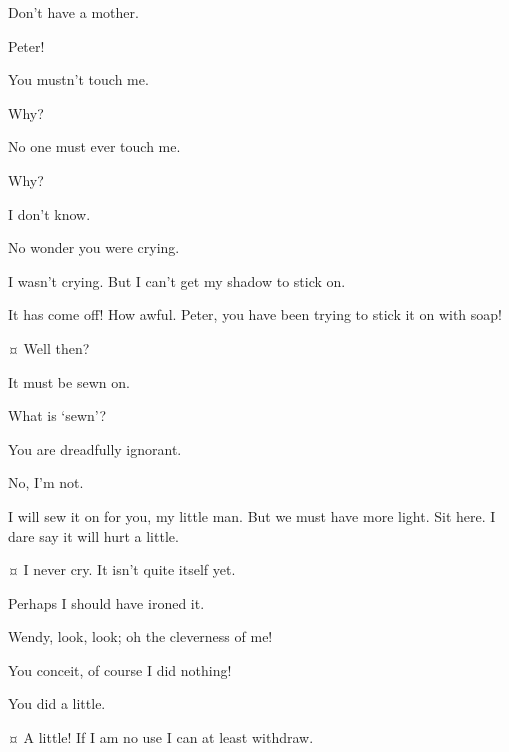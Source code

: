 \begin{drama}
\peterspeaks
Don’t have a mother.

\wendyspeaks
Peter!


\peterspeaks
You mustn’t touch me.

\wendyspeaks
Why?

\peterspeaks
No one must ever touch me.

\wendyspeaks
Why?

\peterspeaks
I don’t know.


\wendyspeaks
No wonder you were crying.

\peterspeaks
I wasn’t crying.
But I can’t get my shadow to stick on.

\wendyspeaks
It has come off!
How awful.
Peter, you have been trying to stick it on with soap!

\peterspeaks {}¤
Well then?

\wendyspeaks
It must be sewn on.

\peterspeaks
What is ‘sewn’?

\wendyspeaks
You are dreadfully ignorant.

\peterspeaks
No, I’m not.

\wendyspeaks
I will sew it on for you, my little man.
But we must have more light.
Sit here.
I dare say it will hurt a little.

\peterspeaks {}¤
I never cry.
It isn’t quite itself yet.

\wendyspeaks
Perhaps I should have ironed it.

\peterspeaks
Wendy, look, look; oh the cleverness of me!

\wendyspeaks
You conceit, of course I did nothing!

\peterspeaks
You did a little.

\wendyspeaks {}¤
A little!
If I am no use I can at least withdraw.


\end{drama}
